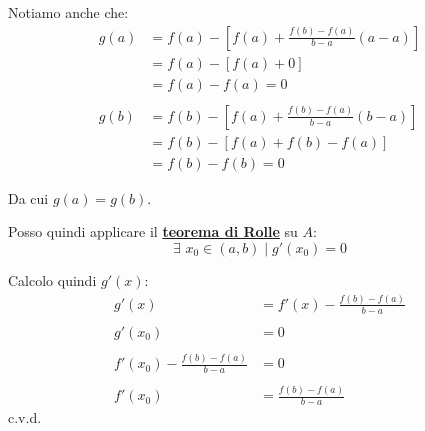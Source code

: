 \documentclass[../../dimostrazioni]{subfiles}
\begin{document}
            Notiamo anche che:
            \begin{align*}
                g(a) &= f(a) - \left[f(a) + \frac{f(b) - f(a)}{b - a}(a - a) \right]\\
                     &= f(a) - \left[f(a) + 0 \right]\\
                     &= f(a) - f(a) = 0\\
                     \\
                g(b) &= f(b) - \left[f(a) + \frac{f(b) - f(a)}{b - a}(b - a) \right]\\
                     &= f(b) - \left[f(a) + f(b) - f(a) \right]\\
                     &= f(b) - f(b) = 0
            \end{align*}
            
            Da cui \( g(a) = g(b) \).

            Posso quindi applicare il \textbf{\hyperref[teoRolle]{teorema di Rolle}} su \( A \):
            \[
                \exists \, \, x_0 \in (a,b) \; | \; g'(x_0) = 0
            \]
            
            Calcolo quindi \( g'(x) \):
            \begin{align*}
                g'(x) &= f'(x) - \frac{f(b) - f(a)}{b-a}\\
                \\
                g'(x_0) &= 0 \\
                \\
                f'(x_0) - \frac{f(b) - f(a)}{b-a} &= 0\\
                \\
                f'(x_0) &= \frac{f(b) - f(a)}{b-a}
            \end{align*} c.v.d.
            
    
\end{document}
